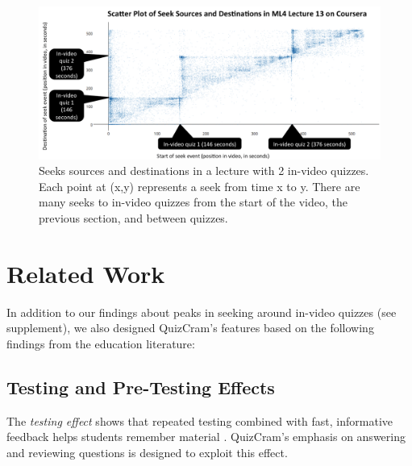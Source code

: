 \documentclass{sigchi}
\begin{document}
\begin{figure}
\includegraphics[width=\columnwidth]{seek-scatterplot}
\caption{Seeks sources and destinations in a lecture with 2 in-video quizzes. Each point at (x,y) represents a seek from time x to y. There are many seeks to in-video quizzes from the start of the video, the previous section, and between quizzes.} %
\label{fig:seek-scatterplot}
\end{figure}

\section{Related Work}
In addition to our findings about peaks in seeking around in-video quizzes (see supplement), we also designed QuizCram's features based on the following findings from the education literature:%

\subsection{Testing and Pre-Testing Effects}

The \emph{testing effect} shows that repeated testing combined with fast, informative feedback helps students remember material \cite{testingeffect}. QuizCram's emphasis on answering and reviewing questions is designed to exploit this effect.

\end{document}
